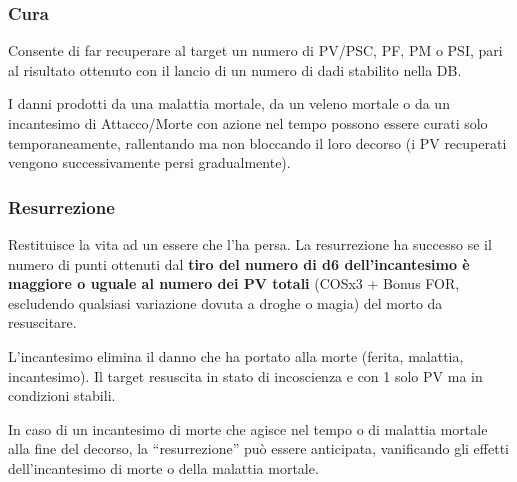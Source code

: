 


\subsubsection{Cura} 

Consente di far recuperare al target un numero di PV/PSC, PF, PM o
PSI, pari al risultato ottenuto con il lancio di un numero di dadi
stabilito nella DB.

I danni prodotti da una malattia mortale, da un veleno mortale o da un
incantesimo di Attacco/Morte con azione nel tempo possono essere
curati solo temporaneamente, rallentando ma non bloccando il loro
decorso (i PV recuperati vengono successivamente persi gradualmente).




\iffullversion
\subsubsection{Resurrezione} 

Restituisce la vita ad un essere che l'ha persa.  La resurrezione ha
successo se il numero di punti ottenuti dal \textbf{tiro del numero di d6
dell'incantesimo \`e maggiore o uguale al numero dei PV totali}
(COSx3 + Bonus FOR, escludendo qualsiasi variazione dovuta a droghe o
magia) del morto da resuscitare.

L'incantesimo elimina il danno che ha portato alla morte (ferita,
malattia, incantesimo).  Il target resuscita in stato di incoscienza e
con 1 solo PV ma in condizioni stabili.

In caso di un incantesimo di morte che agisce nel tempo o di malattia
mortale alla fine del decorso, la ``resurrezione'' pu\`o essere
anticipata, vanificando gli effetti dell'incantesimo di morte o della
malattia mortale. 


